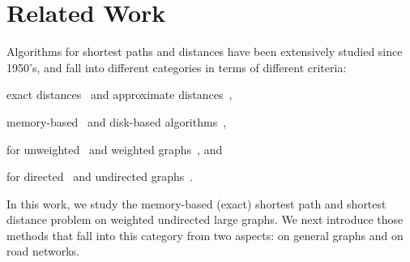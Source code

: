 \section{Related Work}
\label{sec-related}

Algorithms for shortest  paths and distances have been extensively studied since 1950's, and fall into different categories in terms of different criteria:

 \bi
 \item exact distances~\cite{WuXDCZZ12,Dijkstra59,FredmanT84,LubyR89,GeisbergerSSD08,SankaranarayananSA09,SandersS05,GoldbergH05,MozesS12,ChengKCC12,MozesS12,ChanL07,SaundersT07,WagnerW07,bast2014route,delling2014robust,arz2013transit,zhu2013shortest,klein2010shortest,fakcharoenphol2006planar,gupta2004roads}
     and approximate distances~\cite{PotamiasBCG09,SarmaGNP10,ThorupZ05,SankaranarayananS10},


 \item memory-based~\cite{PotamiasBCG09,SarmaGNP10,WuXDCZZ12,Dijkstra59,FredmanT84,LubyR89,GeisbergerSSD08,Wei10,SankaranarayananSA09,SandersS05,
ThorupZ05,MozesS12,SaundersT07,WagnerW07,bast2014route,delling2014robust,arz2013transit,SankaranarayananS10,zhu2013shortest,klein2010shortest,gupta2004roads} and disk-based algorithms~\cite{ChengKCC12,ChanL07},


 \item for unweighted~\cite{PotamiasBCG09,SarmaGNP10,Wei10,bast2014route,delling2014robust,arz2013transit} and weighted graphs~\cite{WuXDCZZ12,Dijkstra59,FredmanT84,LubyR89,GeisbergerSSD08,SankaranarayananSA09,GoldbergH05,MozesS12,SandersS05,ChengKCC12,ThorupZ05,MozesS12,ChanL07,SaundersT07,WagnerW07,bast2014route,delling2014robust,arz2013transit,SankaranarayananS10,zhu2013shortest,klein2010shortest,fakcharoenphol2006planar,gupta2004roads},
     and


 \item for directed~\cite{SaundersT07,GoldbergH05,MozesS12,bast2014route,delling2014robust,arz2013transit,zhu2013shortest,klein2010shortest,fakcharoenphol2006planar} and undirected graphs~\cite{PotamiasBCG09,SarmaGNP10,WuXDCZZ12,Dijkstra59,FredmanT84,LubyR89,GeisbergerSSD08,Wei10,SankaranarayananSA09,SandersS05,ChengKCC12,ThorupZ05,MozesS12,ChanL07,WagnerW07,bast2014route,delling2014robust,arz2013transit,SankaranarayananS10,gupta2004roads}.
 \ei


In this work, we study the memory-based (exact) shortest path and shortest distance problem on weighted undirected large graphs.
%
We next introduce those methods that fall into this category from two aspects: on general graphs and on road networks.

